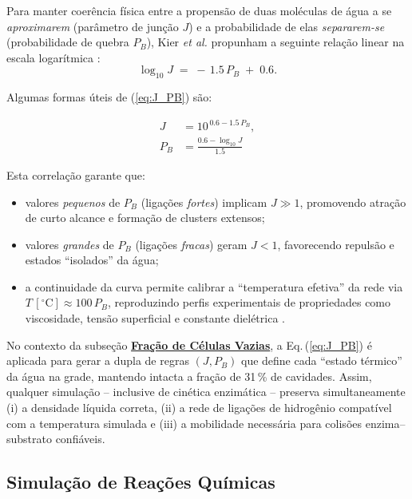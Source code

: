 \documentclass[12pt,oneside]{report}
\begin{document}
Para manter coerência física entre a propensão de duas moléculas de água
a se \emph{aproximarem} (parâmetro de junção $J$) e a probabilidade de elas
\emph{separarem-se} (probabilidade de quebra $P_B$), Kier \emph{et al.}
propunham a seguinte relação linear na escala logarítmica \cite{kier2005}:
\begin{equation}
    \label{eq:J_PB}
    \log_{10} J \;=\; -\,1.5\,P_B \;+\; 0.6 .
\end{equation}

Algumas formas úteis de (\ref{eq:J_PB}) são:

\begin{align}
    J   & = 10^{\,0.6 - 1.5\,P_B},                \\[4pt]
    P_B & = \frac{0.6 - \log_{10} J}{1.5} \tag*{}
\end{align}

Esta correlação garante que:

\begin{itemize}
    \item valores \emph{pequenos} de $P_B$ (ligações \textit{fortes}) implicam
          $J \gg 1$, promovendo atração de curto alcance e formação de clusters
          extensos;
    \item valores \emph{grandes} de $P_B$ (ligações \textit{fracas}) geram
          $J < 1$, favorecendo repulsão e estados “isolados” da água;
    \item a continuidade da curva permite calibrar a ``temperatura efetiva'' da
          rede via $T\,[^{\circ}\mathrm{C}] \approx 100\,P_B$,
          reproduzindo perfis experimentais de propriedades como viscosidade,
          tensão superficial e constante dielétrica \cite{kier2005}.
\end{itemize}

No contexto da subseção \hyperref[subsubsec:fracao_celulas_vazias]{\textbf{Fração de Células Vazias}}, a Eq.\,(\ref{eq:J_PB}) é aplicada
para gerar a dupla de regras $(J,P_B)$ que define cada “estado térmico” da
água na grade, mantendo intacta a fração de 31\,\% de cavidades. Assim,
qualquer simulação – inclusive de cinética enzimática – preserva
simultaneamente (i) a densidade líquida correta, (ii) a rede de ligações de
hidrogênio compatível com a temperatura simulada e (iii) a mobilidade
necessária para colisões enzima–substrato confiáveis.

\subsection{Simulação de Reações Químicas}
\end{document}
